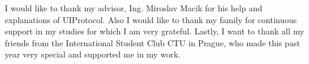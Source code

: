 \startAcknowledgement
I would like to thank my advisor, Ing. Miroslav Macik for his help  and explanations of UIProtocol. Also I would like to thank my family for continuous support in my studies for which I am very grateful. Lastly, I want to thank all my friends from the International Student Club CTU in Prague, who made this past year very special and supported me in my work.
\stopAcknowledgement

\endinput
